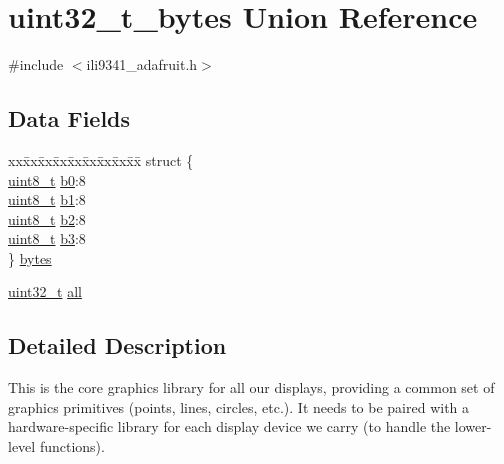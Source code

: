 \hypertarget{unionuint32__t__bytes}{}\section{uint32\+\_\+t\+\_\+bytes Union Reference}
\label{unionuint32__t__bytes}


{\ttfamily \#include $<$ili9341\+\_\+adafruit.\+h$>$}

\subsection*{Data Fields}
\begin{DoxyCompactItemize}
\item 
\begin{tabbing}
xx\=xx\=xx\=xx\=xx\=xx\=xx\=xx\=xx\=\kill
struct \{\\
\>\hyperlink{send_8c_aba7bc1797add20fe3efdf37ced1182c5}{uint8\_t} \hyperlink{unionuint32__t__bytes_a92b86537decb69327191d870f41c60f7}{b0}:8\\
\>\hyperlink{send_8c_aba7bc1797add20fe3efdf37ced1182c5}{uint8\_t} \hyperlink{unionuint32__t__bytes_a91fb31482a2ce44b454fca964dcd556b}{b1}:8\\
\>\hyperlink{send_8c_aba7bc1797add20fe3efdf37ced1182c5}{uint8\_t} \hyperlink{unionuint32__t__bytes_a462312b99de0c6d1c497064902196e1d}{b2}:8\\
\>\hyperlink{send_8c_aba7bc1797add20fe3efdf37ced1182c5}{uint8\_t} \hyperlink{unionuint32__t__bytes_abd7739cae59fab7cf712d53f337b378a}{b3}:8\\
\} \hyperlink{unionuint32__t__bytes_a50aeebe398ee3b740421f1cc8d8583b8}{bytes}\\

\end{tabbing}\item 
\hyperlink{send_8c_a435d1572bf3f880d55459d9805097f62}{uint32\+\_\+t} \hyperlink{unionuint32__t__bytes_a83b0c87830b60d185365dbadf8efd4a0}{all}
\end{DoxyCompactItemize}


\subsection{Detailed Description}
This is the core graphics library for all our displays, providing a common set of graphics primitives (points, lines, circles, etc.). It needs to be paired with a hardware-\/specific library for each display device we carry (to handle the lower-\/level functions).

